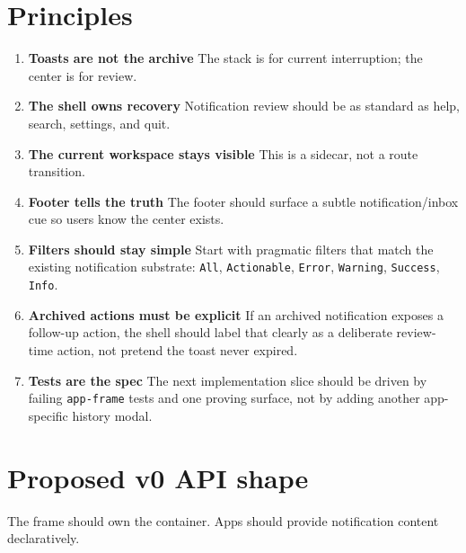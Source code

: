 \section{Principles}\label{record-053-principles}

\begin{enumerate}
\def\labelenumi{\arabic{enumi}.}
\item
  \textbf{Toasts are not the archive} The stack is for current interruption; the center is for review.
\item
  \textbf{The shell owns recovery} Notification review should be as standard as help, search, settings, and quit.
\item
  \textbf{The current workspace stays visible} This is a sidecar, not a route transition.
\item
  \textbf{Footer tells the truth} The footer should surface a subtle notification/inbox cue so users know the center exists.
\item
  \textbf{Filters should stay simple} Start with pragmatic filters that match the existing notification substrate: \texttt{A\allowbreak{}l\allowbreak{}l}, \texttt{A\allowbreak{}c\allowbreak{}t\allowbreak{}i\allowbreak{}o\allowbreak{}n\allowbreak{}a\allowbreak{}b\allowbreak{}l\allowbreak{}e}, \texttt{E\allowbreak{}r\allowbreak{}r\allowbreak{}o\allowbreak{}r}, \texttt{W\allowbreak{}a\allowbreak{}r\allowbreak{}n\allowbreak{}i\allowbreak{}n\allowbreak{}g}, \texttt{S\allowbreak{}u\allowbreak{}c\allowbreak{}c\allowbreak{}e\allowbreak{}s\allowbreak{}s}, \texttt{I\allowbreak{}n\allowbreak{}f\allowbreak{}o}.
\item
  \textbf{Archived actions must be explicit} If an archived notification exposes a follow-up action, the shell should label that clearly as a deliberate review-time action, not pretend the toast never expired.
\item
  \textbf{Tests are the spec} The next implementation slice should be driven by failing \texttt{a\allowbreak{}p\allowbreak{}p\allowbreak{}-\allowbreak{}f\allowbreak{}r\allowbreak{}a\allowbreak{}m\allowbreak{}e} tests and one proving surface, not by adding another app-specific history modal.
\end{enumerate}

\section{Proposed v0 API shape}\label{record-053-proposed-v0-api-shape}

The frame should own the container. Apps should provide notification content declaratively.

